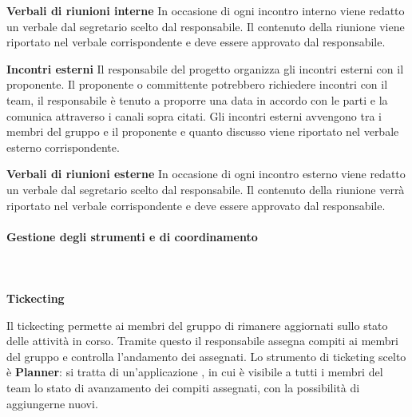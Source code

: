 \textbf{Verbali di riunioni interne} \newline \newline
In occasione di ogni incontro interno viene redatto un verbale dal segretario scelto dal responsabile. Il contenuto della riunione viene riportato nel verbale corrispondente e deve essere approvato dal responsabile.

\textbf{Incontri esterni} \newline \newline
Il responsabile del progetto organizza gli incontri esterni con il proponente. Il proponente o committente potrebbero richiedere incontri con il team, il responsabile è tenuto a proporre una data in accordo con le parti e la comunica attraverso i canali sopra citati.
Gli incontri esterni avvengono tra i membri del gruppo e il proponente e quanto discusso viene riportato nel verbale esterno corrispondente.\newline \newline

\textbf{Verbali di riunioni esterne}  \newline \newline
In occasione di ogni incontro esterno viene redatto un verbale dal segretario scelto dal responsabile. Il contenuto della riunione verrà riportato nel verbale corrispondente e deve essere approvato dal responsabile.

\paragraph{Gestione degli strumenti e di coordinamento}\mbox{}\\ \mbox{}\\
\textbf{Tickecting}

Il tickecting permette ai membri del gruppo di rimanere aggiornati sullo stato delle attività in corso. Tramite questo il responsabile assegna compiti ai membri del gruppo e controlla l'andamento dei  assegnati. Lo strumento di ticketing scelto è \textbf{Planner}: si tratta di un'applicazione , in cui è visibile a tutti i membri del team lo stato di avanzamento dei compiti assegnati, con la possibilità di aggiungerne nuovi. 

